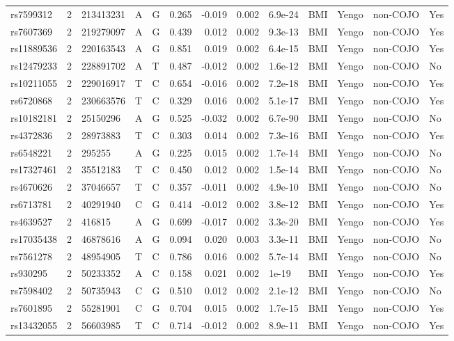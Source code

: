 \documentclass[11pt,twoside]{bristolthesis}
\begin{document}
\begin{longtable}[t]{lrlllrrrlllll}
rs7599312 & 2 & 213413231 & A & G & 0.265 & -0.019 & 0.002 & 6.9e-24 & BMI & Yengo & non-COJO & Yes\\
rs7607369 & 2 & 219279097 & A & G & 0.439 & 0.012 & 0.002 & 9.3e-13 & BMI & Yengo & non-COJO & Yes\\
\addlinespace
rs11889536 & 2 & 220163543 & A & G & 0.851 & 0.019 & 0.002 & 6.4e-15 & BMI & Yengo & non-COJO & Yes\\
rs12479233 & 2 & 228891702 & A & T & 0.487 & -0.012 & 0.002 & 1.6e-12 & BMI & Yengo & non-COJO & No\\
rs10211055 & 2 & 229016917 & T & C & 0.654 & -0.016 & 0.002 & 7.2e-18 & BMI & Yengo & non-COJO & Yes\\
rs6720868 & 2 & 230663576 & T & C & 0.329 & 0.016 & 0.002 & 5.1e-17 & BMI & Yengo & non-COJO & Yes\\
rs10182181 & 2 & 25150296 & A & G & 0.525 & -0.032 & 0.002 & 6.7e-90 & BMI & Yengo & non-COJO & No\\
\addlinespace
rs4372836 & 2 & 28973883 & T & C & 0.303 & 0.014 & 0.002 & 7.3e-16 & BMI & Yengo & non-COJO & Yes\\
rs6548221 & 2 & 295255 & A & G & 0.225 & 0.015 & 0.002 & 1.7e-14 & BMI & Yengo & non-COJO & No\\
rs17327461 & 2 & 35512183 & T & C & 0.450 & 0.012 & 0.002 & 1.5e-14 & BMI & Yengo & non-COJO & No\\
rs4670626 & 2 & 37046657 & T & C & 0.357 & -0.011 & 0.002 & 4.9e-10 & BMI & Yengo & non-COJO & No\\
rs6713781 & 2 & 40291940 & C & G & 0.414 & -0.012 & 0.002 & 3.8e-12 & BMI & Yengo & non-COJO & Yes\\
\addlinespace
rs4639527 & 2 & 416815 & A & G & 0.699 & -0.017 & 0.002 & 3.3e-20 & BMI & Yengo & non-COJO & Yes\\
rs17035438 & 2 & 46878616 & A & G & 0.094 & 0.020 & 0.003 & 3.3e-11 & BMI & Yengo & non-COJO & No\\
rs7561278 & 2 & 48954905 & T & C & 0.786 & 0.016 & 0.002 & 5.7e-14 & BMI & Yengo & non-COJO & No\\
rs930295 & 2 & 50233352 & A & C & 0.158 & 0.021 & 0.002 & 1e-19 & BMI & Yengo & non-COJO & Yes\\
rs7598402 & 2 & 50735943 & C & G & 0.510 & 0.012 & 0.002 & 2.1e-12 & BMI & Yengo & non-COJO & No\\
\addlinespace
rs7601895 & 2 & 55281901 & C & G & 0.704 & 0.015 & 0.002 & 1.7e-15 & BMI & Yengo & non-COJO & Yes\\
rs13432055 & 2 & 56603985 & T & C & 0.714 & -0.012 & 0.002 & 8.9e-11 & BMI & Yengo & non-COJO & Yes\\

\end{longtable}
\end{document}
